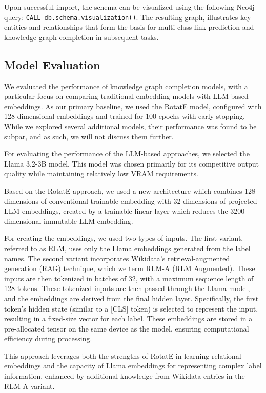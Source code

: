 Upon successful import, the schema can be visualized using the following Neo4j query: \texttt{CALL db.schema.visualization()}.
The resulting graph, illustrates key entities and relationships that form the basis for multi-class link prediction and knowledge graph completion in subsequent tasks.

\subsection*{Model Evaluation}
\label{model-evaluation}
We evaluated the performance of knowledge graph completion models, with a particular focus on comparing traditional embedding models with LLM-based embeddings.
As our primary baseline, we used the RotatE model, configured with 128-dimensional embeddings and trained for 100 epochs with early stopping.
While we explored several additional models, their performance was found to be subpar, and as such, we will not discuss them further.

For evaluating the performance of the LLM-based approaches, we selected the Llama 3.2-3B model.
This model was chosen primarily for its competitive output quality while maintaining relatively low VRAM requirements.

Based on the RotatE approach, we used a new architecture which combines 128 dimensions of conventional trainable embedding with 32 dimensions of projected LLM embeddings,
created by a trainable linear layer which reduces the 3200 dimensional immutable LLM embedding.

For creating the embeddings, we used two types of inputs.
The first variant, referred to as RLM, uses only the Llama embeddings generated from the label names.
The second variant incorporates Wikidata's retrieval-augmented generation (RAG) technique, which we term RLM-A (RLM Augmented).
These inputs are then tokenized in batches of 32, with a maximum sequence length of 128 tokens.
These tokenized inputs are then passed through the Llama model, and the embeddings are derived from the final hidden layer.
Specifically, the first token's hidden state (similar to a [CLS] token) is selected to represent the input, resulting in a fixed-size vector for each label.
These embeddings are stored in a pre-allocated tensor on the same device as the model, ensuring computational efficiency during processing.

This approach leverages both the strengths of RotatE in learning relational embeddings and the capacity of Llama embeddings for representing complex label information,
enhanced by additional knowledge from Wikidata entries in the RLM-A variant.
